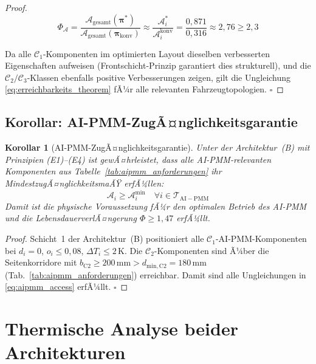 ﻿\documentclass[12pt,a4paper]{article}
\newtheorem{corollary}[theorem]{Korollar}
\begin{document}
\begin{proof}
\begin{equation}
	\Phi_\mathcal{A} = \frac{\mathcal{A}_\mathrm{gesamt}(\boldsymbol{\pi}^*)}
	{\mathcal{A}_\mathrm{gesamt}(\boldsymbol{\pi}_\mathrm{konv})}
	\approx \frac{\mathcal{A}_i^*}{\mathcal{A}_i^\mathrm{konv}}
	= \frac{0{,}871}{0{,}316} \approx 2{,}76 \geq 2{,}3
	\label{eq:phi_a_beweis}
\end{equation}

Da alle $\mathcal{C}_1$-Komponenten im optimierten Layout dieselben verbesserten
Eigenschaften aufweisen (Frontschicht-Prinzip garantiert dies strukturell), und die
$\mathcal{C}_2/\mathcal{C}_3$-Klassen ebenfalls positive Verbesserungen zeigen,
gilt die Ungleichung \eqref{eq:erreichbarkeits_theorem} fÃ¼r alle relevanten
Fahrzeugtopologien. \hfill$\square$
\end{proof}

\subsection{Korollar: AI-PMM-ZugÃ¤nglichkeitsgarantie}

\begin{corollary}[AI-PMM-ZugÃ¤nglichkeitsgarantie]
	\label{cor:aipmm_access}
	Unter der Architektur~(B) mit Prinzipien (E1)--(E4) ist gewÃ¤hrleistet, dass
	alle AI-PMM-relevanten Komponenten aus Tabelle~\ref{tab:aipmm_anforderungen}
	ihr MindestzugÃ¤nglichkeitsmaÃŸ erfÃ¼llen:
	\begin{equation}
		\mathcal{A}_i \geq \mathcal{A}_i^\mathrm{min} \quad
		\forall i \in \mathcal{T}_\mathrm{AI-PMM}
		\label{eq:aipmm_access}
	\end{equation}
	Damit ist die physische Voraussetzung fÃ¼r den optimalen Betrieb des AI-PMM
	und die LebensdauerverlÃ¤ngerung $\Phi \geq 1{,}47$ \cite{Epp2026liion} erfÃ¼llt.
\end{corollary}

\begin{proof}
	Schicht~1 der Architektur~(B) positioniert alle $\mathcal{C}_1$-AI-PMM-Komponenten
	bei $d_i = 0$, $o_i \leq 0{,}08$, $\Delta T_i \leq 2\,\mathrm{K}$.
	Die $\mathcal{C}_2$-Komponenten sind Ã¼ber die Seitenkorridore mit $b_\mathrm{C2} \geq
	200\,\mathrm{mm} > d_\mathrm{min,C2} = 180\,\mathrm{mm}$ (Tab.~\ref{tab:aipmm_anforderungen})
	erreichbar. Damit sind alle Ungleichungen in \eqref{eq:aipmm_access} erfÃ¼llt.
	\hfill$\square$
\end{proof}

\section{Thermische Analyse beider Architekturen}
\label{sec:thermik}
\end{document}
